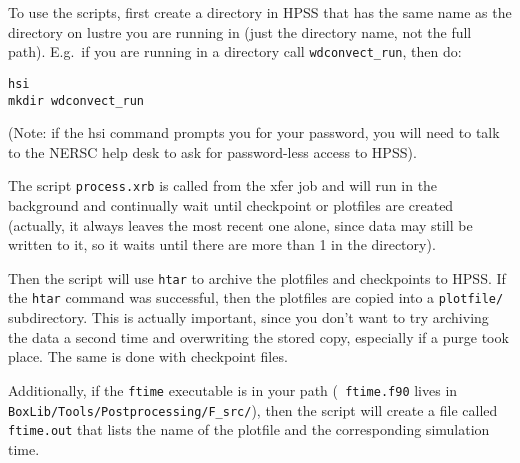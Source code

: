To use the scripts, first create a directory in HPSS that has the same          
name as the directory on lustre you are running in (just the directory          
name, not the full path).  E.g.\ if you are running in a directory              
call {\tt wdconvect\_run}, then do:                                             
\begin{verbatim}                                                                
hsi                                                                             
mkdir wdconvect_run                                                             
\end{verbatim}                                                                  
(Note: if the hsi command prompts you for your password, you will need          
to talk to the NERSC help desk to ask for password-less access to                
HPSS).                                                                          
                                                                                
The script {\tt process.xrb} is called from the xfer job and will
run in the background and continually wait until checkpoint or                  
plotfiles are created (actually, it always leaves the most recent one           
alone, since data may still be written to it, so it waits until there           
are more than 1 in the directory).                                              
                                                                                
Then the script will use {\tt htar} to archive the plotfiles and                
checkpoints to HPSS.  If the {\tt htar} command was successful, then            
the plotfiles are copied into a {\tt plotfile/} subdirectory.  This is          
actually important, since you don't want to try archiving the data a            
second time and overwriting the stored copy, especially if a purge              
took place.  The same is done with checkpoint files.
                                                                                
Additionally, if the {\tt ftime} executable is in your path ({\tt               
ftime.f90} lives in {\tt BoxLib/Tools/Postprocessing/F\_src/}), then            
the script will create a file called {\tt ftime.out} that lists the             
name of the plotfile and the corresponding simulation time.                     
                                                                                
